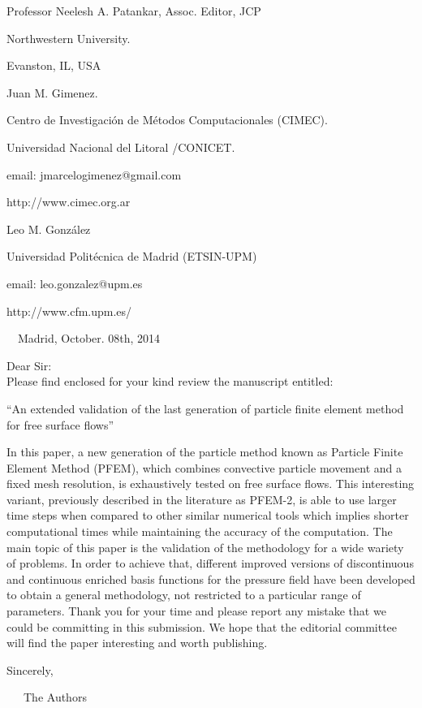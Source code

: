 \documentclass[a4paper,12pt]{article}
\newcommand{\rc}{\\[0.1 in]}
\begin{document}
\thispagestyle{empty}
%
\noindent Professor Neelesh A. Patankar, Assoc. Editor, JCP  

Northwestern University. 

Evanston, IL, USA$$$$


\hspace{6cm}Juan M. Gimenez.

\hspace{6cm}Centro de Investigaci\'on de M\'etodos Computacionales (CIMEC).

\hspace{6cm}Universidad Nacional del Litoral /CONICET.

\hspace{6cm}email: jmarcelogimenez@gmail.com

\hspace{6cm}http://www.cimec.org.ar

\hspace{6cm}

\hspace{6cm}Leo M. Gonz\'{a}lez

\hspace{6cm}Universidad Polit\'{e}cnica de Madrid (ETSIN-UPM)

\hspace{6cm}email: leo.gonzalez@upm.es

\hspace{6cm}http://www.cfm.upm.es/

\vspace{2cm}

$\quad$\hspace{10cm}Madrid, October. 08th, 2014
$$$$

\noindent Dear Sir:\rc
%
Please find enclosed for your kind review the manuscript entitled:
%
\begin{center}
``An extended validation of the last generation of particle finite element method for free surface flows''
\end{center}
%
In this paper, a new generation of the particle method known as Particle Finite
 Element Method (PFEM), which combines convective particle movement and a fixed 
 mesh resolution, is exhaustively tested on free surface flows. This interesting variant, 
 previously described in the literature as PFEM-2, is able to use larger time steps when compared to other similar numerical tools which implies shorter computational times while maintaining the accuracy of the computation. The main topic of this paper is the validation of the methodology for a wide wariety of problems. In order to achieve that, different improved versions of discontinuous and continuous enriched basis functions for the pressure field have been developed to obtain a general methodology, not restricted to a particular range of parameters.
%
%
%
Thank you for your time and please report any mistake that we could be
committing in this submission.
%
We hope that the editorial committee will find the paper interesting and worth
publishing.

%
$$$$
Sincerely,
\vspace{0.5cm}

\ \ \ The Authors
$$\quad$$
%
% 
\end{document}
